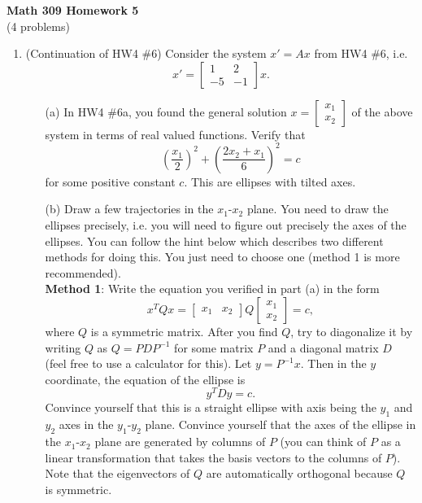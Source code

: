 \documentclass[11pt]{article}
\theoremstyle{definition}
\begin{document}
\begin{center}
\textbf{Math 309 Homework 5}\\
(4 problems)
\end{center}
\vspace{0.15in}


\begin{enumerate}[leftmargin=*]

\item (Continuation of HW4 \#6) Consider the system $x'=Ax$ from HW4 \#6, i.e.\[
x'=\left[
\begin{array}{cc}
1 & 2\\
-5 & -1
\end{array}\right]x.
\]

\begin{itemize}
\item[(a)]  In HW4 \#6a, you found the general solution $x=\left[
\begin{array}{c}
x_1\\
x_2
\end{array}\right]$ of the above system in terms of real valued functions.  Verify that 
\[
\left(\frac{x_1}{2}\right)^2+\left(\frac{2x_2+x_1}{6}\right)^2=c
\]
for some positive constant $c$.  This are ellipses with tilted axes.\\

\item[(b)] Draw a few trajectories in the $x_1$-$x_2$ plane.  You need to draw the ellipses precisely, i.e. you will need to figure out precisely the axes of the ellipses. You can follow the hint below which describes two different methods for doing this.  You just need to choose one (method 1 is more recommended).  \\




\textbf{Method 1}: Write the equation you verified in part (a) in the form
\[
x^TQ x =\left[\begin{array}{cc} x_1 & x_2\end{array}\right]Q \left[\begin{array}{c} x_1 \\ x_2\end{array}\right]=c,
\]
where $Q$ is a symmetric matrix.  After you find $Q$,  try to diagonalize it by writing $Q$ as $Q=PDP^{-1}$ for some matrix $P$ and a diagonal matrix $D$ (feel free to use a calculator for this).  Let $y=P^{-1} x$.  Then in the $y$ coordinate, the equation of the  ellipse is 
\[
y^TDy=c.  
\]
Convince yourself that this is a straight ellipse with axis being the $y_1$ and $y_2$ axes in the $y_1$-$y_2$ plane.  Convince yourself  that the axes of the ellipse in the $x_1$-$x_2$ plane are generated by columns of $P$ (you can think of $P$ as a linear transformation that takes the basis vectors to the columns of $P$).   Note that the eigenvectors of $Q$ are automatically orthogonal because $Q$ is symmetric.\\


\end{itemize}
\end{enumerate}
\end{document}
